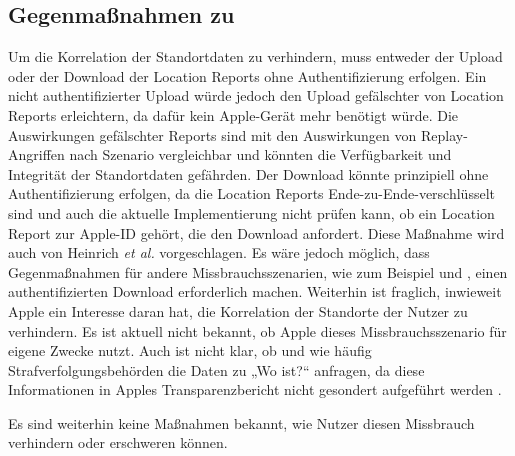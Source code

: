 \subsection{Gegenmaßnahmen zu }
Um die Korrelation der Standortdaten zu verhindern, muss entweder der Upload oder der Download der Location Reports ohne Authentifizierung erfolgen.
Ein nicht authentifizierter Upload würde jedoch den Upload gefälschter von Location Reports erleichtern, da dafür kein Apple-Gerät mehr benötigt würde.
Die Auswirkungen gefälschter Reports sind mit den Auswirkungen von Replay-Angriffen nach Szenario  vergleichbar und könnten die Verfügbarkeit und Integrität der Standortdaten gefährden.
Der Download könnte prinzipiell ohne Authentifizierung erfolgen, da die Location Reports Ende-zu-Ende-verschlüsselt sind und auch die aktuelle Implementierung nicht prüfen kann, ob ein Location Report zur Apple-ID gehört, die den Download anfordert.
Diese Maßnahme wird auch von Heinrich \textit{et al.} \cite{Heinrich_FindMy} vorgeschlagen.
Es wäre jedoch möglich, dass Gegenmaßnahmen für andere Missbrauchsszenarien, wie zum Beispiel  und , einen authentifizierten Download erforderlich machen.
Weiterhin ist fraglich, inwieweit Apple ein Interesse daran hat, die Korrelation der Standorte der Nutzer zu verhindern.
Es ist aktuell nicht bekannt, ob Apple dieses Missbrauchsszenario für eigene Zwecke nutzt.
Auch ist nicht klar, ob und wie häufig Strafverfolgungsbehörden die Daten zu „Wo ist?“ anfragen, da diese Informationen in Apples Transparenzbericht nicht gesondert aufgeführt werden \cite{Apple_Transparency}.

Es sind weiterhin keine Maßnahmen bekannt, wie Nutzer diesen Missbrauch verhindern oder erschweren können.
